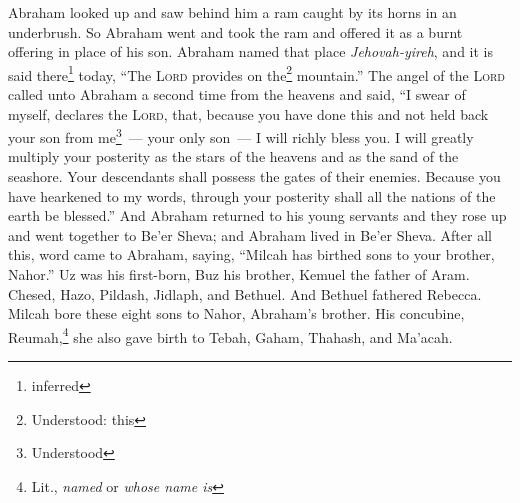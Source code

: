 \begin{enumerate}[align=center]
     Abraham looked up and saw behind him a ram caught by its horns in an underbrush. So Abraham went and took the ram and offered it as a burnt offering in place of his son.%
     Abraham named that place \textit{Jehovah-yireh}, and it is said there\footnote{inferred} today, ``The \textsc{Lord} provides on the\footnote{Understood: this} mountain.''%
     The angel of the \textsc{Lord} called unto Abraham a second time from the heavens%
     and said, ``I swear of myself, declares the \textsc{Lord}, that, because you have done this and not held back your son from me\footnote{Understood}~--- your only son~---%
     I will richly bless you. I will greatly multiply your posterity as the stars of the heavens and as the sand of the seashore. Your descendants shall possess the gates of their enemies.%
     Because you have hearkened to my words, through your posterity shall all the nations of the earth be blessed.''%
     And Abraham returned to his young servants and they rose up and went together to Be'er Sheva; and Abraham lived in Be'er Sheva.%
     After all this, word came to Abraham, saying, ``Milcah has birthed sons to your brother, Nahor.''%
     Uz was his first-born, Buz his brother, Kemuel the father of Aram.%
     Chesed, Hazo, Pildash, Jidlaph, and Bethuel.%
     And Bethuel fathered Rebecca. Milcah bore these eight sons to Nahor, Abraham's brother.%
     His concubine, Reumah,\footnote{Lit., \textit{named} or \textit{whose name is}} she also gave birth to Tebah, Gaham, Thahash, and Ma'acah.%
\end{enumerate}
